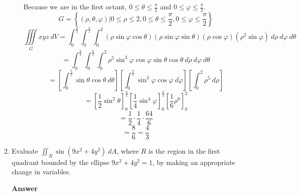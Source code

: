 \documentclass[12pt, letterpaper]{article}
\begin{document}
\begin{enumerate}
\begin{enumerate}
        Because we are in the first octant, $\displaystyle 0 \le \theta \le \frac{\pi}{2}$
        and $\displaystyle 0 \le \varphi \le \frac{\pi}{2}$.
        \[G = \left\{ (\rho, \theta, \varphi) |
        0 \le \rho \le 2,
        0 \le \theta \le \frac{\pi}{2},
        0 \le \varphi \le \frac{\pi}{2} \right\}\]
        \[\iiint\limits_G xyz\ dV =
        \int_{0}^{\frac{\pi}{2}} \int_{0}^{\frac{\pi}{2}} \int_{0}^{2}
        (\rho \sin \varphi \cos \theta) (\rho \sin \varphi \sin \theta)(\rho \cos \varphi)
        (\rho^2 \sin \varphi)\ d\rho\ d\varphi\ d\theta\]
        \[ = \int_{0}^{\frac{\pi}{2}} \int_{0}^{\frac{\pi}{2}} \int_{0}^{2}
        \rho^5 \sin^3 \varphi \cos \varphi \sin \theta \cos \theta\ d\rho\ d\varphi\ d\theta
        \]
        \[ = \left[\int_{0}^{\frac{\pi}{2}} \sin \theta \cos \theta\ d\theta\right]
        \left[\int_{0}^{\frac{\pi}{2}} \sin^3 \varphi \cos \varphi\ d\varphi\right]
        \left[\int_{0}^{2} \rho^5\ d\rho\right]\]
        \[ = \left[\frac{1}{2}\sin^2 \theta\right]_0^{\frac{\pi}{2}}
        \left[\frac{1}{4} \sin^4 \varphi\right]_0^{\frac{\pi}{2}}
        \left[\frac{1}{6}\rho^6\right]_0^2\]
        \[ = \frac{1}{2} \cdot \frac{1}{4} \cdot \frac{64}{6}\]
        \[ = \frac{8}{6} = \frac{4}{3}\]

      \end{enumerate}

      \item Evaluate $\iint_R \sin(9x^2 + 4y^2)\ dA$, where $R$ is the region in the first quadrant
      bounded by the ellipse $9x^2 + 4y^2 = 1$, by making an appropriate change in variables.

      \textbf{Answer}


\end{enumerate}
\end{document}
